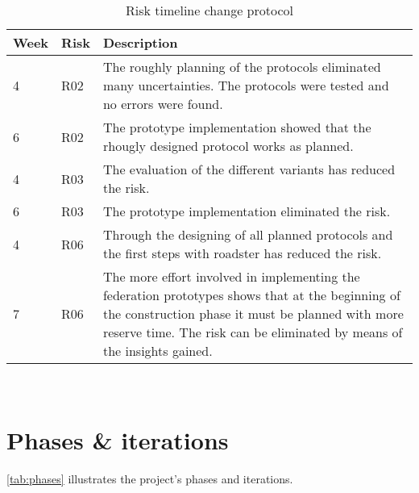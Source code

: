 \begin{table}[H]
  \centering
  \begin{tabular}{|p{20mm}|p{20mm}|p{102mm}|}
    \hline \bf Week & \bf Risk & \bf Description \\%
    \hline 4 & R02 & The roughly planning of the protocols eliminated many uncertainties. \newline 
	The protocols were tested and no errors were found. \\%
	\hline 6 & R02 & The prototype implementation showed that the rhougly designed protocol works as planned. \\%
    \hline 4 & R03 & The evaluation of the different variants has reduced the risk. \\%
	\hline 6 & R03 & The prototype implementation eliminated the risk. \\%
	\hline 4 & R06 & Through the designing of all planned protocols and the first steps with roadster has reduced the risk. \\%
	\hline 7 & R06 & The more effort involved in implementing the federation prototypes shows
		 that at the beginning of the construction phase it must be planned with more reserve time.
		The risk can be eliminated by means of the insights gained. \\%
    \hline
  \end{tabular} \\
  \caption{Risk timeline change protocol}
\end{table}


\section{Phases \& iterations}
\autoref{tab:phases} illustrates the project's phases and iterations.

